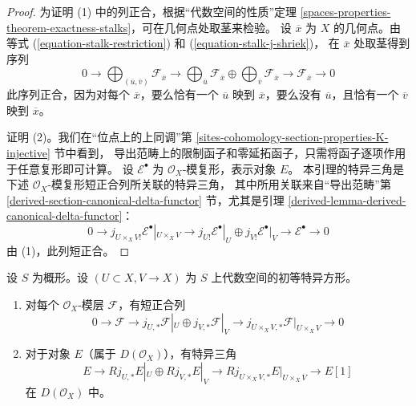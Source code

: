 \begin{proof}
为证明 (1) 中的列正合，根据“代数空间的性质”定理
\ref{spaces-properties-theorem-exactness-stalks}，可在几何点处取茎来检验。
设 $\overline{x}$ 为 $X$ 的几何点。由等式
(\ref{equation-stalk-restriction}) 和 (\ref{equation-stalk-j-shriek})，
在 $\overline{x}$ 处取茎得到序列
$$
0 \to
\bigoplus\nolimits_{(\overline{u}, \overline{v})} \mathcal{F}_{\overline{x}}
\to
\bigoplus\nolimits_{\overline{u}} \mathcal{F}_{\overline{x}}
\oplus
\bigoplus\nolimits_{\overline{v}} \mathcal{F}_{\overline{x}}
\to
\mathcal{F}_{\overline{x}} \to 0
$$
此序列正合，因为对每个 $\overline{x}$，要么恰有一个
$\overline{u}$ 映到 $\overline{x}$，要么没有 $\overline{u}$，且恰有一个
$\overline{v}$ 映到 $\overline{x}$。

\medskip\noindent
证明 (2)。我们在“位点上的上同调”第
\ref{sites-cohomology-section-properties-K-injective} 节中看到，
导出范畴上的限制函子和零延拓函子，只需将函子逐项作用于任意复形即可计算。
设 $\mathcal{E}^\bullet$ 为 $\mathcal{O}_X$-模复形，表示对象 $E$。
本引理的特异三角是下述 $\mathcal{O}_X$-模复形短正合列所关联的特异三角，
其中所用关联来自“导出范畴”第
\ref{derived-section-canonical-delta-functor} 节，尤其是引理
\ref{derived-lemma-derived-canonical-delta-functor}：
$$
0 \to j_{U \times_X V!}\mathcal{E}^\bullet|_{U \times_X V} \to
j_{U!}\mathcal{E}^\bullet|_U \oplus j_{V!}\mathcal{E}^\bullet|_V
\to \mathcal{E}^\bullet \to 0
$$
由 (1)，此列短正合。
\end{proof}

\begin{lemma}
\label{lemma-exact-sequence-j-star}
设 $S$ 为概形。设 $(U \subset X, V \to X)$ 为 $S$ 上代数空间的初等特异方形。
\begin{enumerate}
\item 对每个 $\mathcal{O}_X$-模层 $\mathcal{F}$，有短正合列
$$
0 \to \mathcal{F} \to
j_{U, *}\mathcal{F}|_U \oplus j_{V, *}\mathcal{F}|_V \to
j_{U \times_X V, *}\mathcal{F}|_{U \times_X V} \to 0
$$
\item 对于对象 $E$（属于 $D(\mathcal{O}_X)$），有特异三角
$$
E \to
Rj_{U, *}E|_U \oplus Rj_{V, *}E|_V \to
Rj_{U \times_X V, *}E|_{U \times_X V} \to
E[1]
$$
在 $D(\mathcal{O}_X)$ 中。
\end{enumerate}
\end{lemma}

